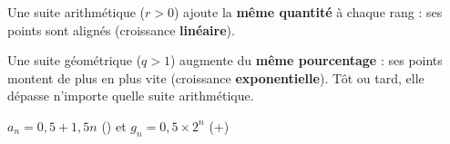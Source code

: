 \documentclass[11pt,a4paper]{article}
\makeatletter
\newcommand{\lycee@gradx}[1]{\foreach \k/\l in {#1}{%
  \draw (\k,0.07)--(\k,-0.07) node[below,font=\scriptsize,inner sep=1.5pt]{$\l$};}}
\newcommand{\lycee@grady}[1]{\foreach \k/\l in {#1}{%
  \draw (0.07,\k)--(-0.07,\k) node[left,font=\scriptsize,inner sep=1.5pt]{$\l$};}}
\providecommand{\gradx}{\lycee@gradx}%
\providecommand{\grady}{\lycee@grady}%
\makeatother
\begin{document}
\begin{remarquebox}
\begin{minipage}[c]{0.58\linewidth}\raggedright
Une suite arithmétique ($r>0$) ajoute la \textbf{même quantité} à chaque rang : ses
points sont alignés (croissance \textbf{linéaire}).

\smallskip
Une suite géométrique ($q>1$) augmente du \textbf{même pourcentage} : ses points
montent de plus en plus vite (croissance \textbf{exponentielle}). Tôt ou tard, elle
dépasse n'importe quelle suite arithmétique.
\end{minipage}\hfill
\begin{minipage}[c]{0.38\linewidth}\centering
{}

\smallskip
{\footnotesize $a_{n}=0{,}5+1{,}5n$ (\texttimes) et $g_{n}=0{,}5\times 2^{n}$ (+)}
\end{minipage}
\end{remarquebox}
\end{document}
